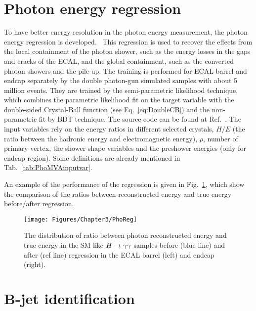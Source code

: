 \section{Photon energy regression}


To have better energy resolution in the photon energy measurement, the photon energy regression is developed.~\cite{1502.02702}
This regression is used to recover the effects from the local containment of the photon shower, such as the energy losses in the gaps and cracks of the ECAL, and the global containment, such as the converted photon showers and the pile-up.
The training is performed for ECAL barrel and endcap separately by the double photon-gun simulated samples with about 5 million events.
They are trained by the semi-parametric likelihood technique, which combines the parametric likelihood fit on the target variable with the double-sided Crystal-Ball function (see Eq.~\ref{eq:DoubleCB}) and the non-parametric fit by BDT technique.
The source code can be found at Ref.~\cite{GBRlikelihood}.
The input variables rely on the energy ratios in different selected crystals, $H/E$ (the ratio between the hadronic energy and electromagnetic energy), $\rho$, number of primary vertex, the shower shape variables and the preshower energies (only for endcap region). 
Some definitions are already mentioned in Tab.~\ref{tab:PhoMVAinputvar}. 

An example of the performance of the regression is given in Fig.~\ref{fig:PhoReg}, which show the comparison of the ratios between reconstructed energy and true energy before/after regression.

\begin{figure}[h]
  \centering
  \texttt{[image: Figures/Chapter3/PhoReg]}
  \caption{The distribution of ratio between photon reconstructed energy and true energy in the SM-like $H\to\gamma\gamma$ samples before (blue line) and after (ref line) regression in the ECAL barrel (left) and endcap (right).}
  \label{fig:PhoReg}
\end{figure}

\section{B-jet identification} \label{sec:btag}

